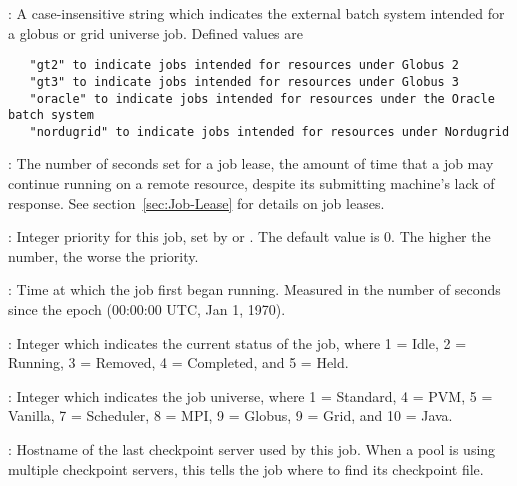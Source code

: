\begin{description}
\item[\AdAttr{JobGridType}] : A case-insensitive string which indicates
the external batch system intended for a globus or grid universe job.
Defined values are
\footnotesize
\begin{verbatim}
   "gt2" to indicate jobs intended for resources under Globus 2
   "gt3" to indicate jobs intended for resources under Globus 3
   "oracle" to indicate jobs intended for resources under the Oracle batch system
   "nordugrid" to indicate jobs intended for resources under Nordugrid
\end{verbatim}
\normalsize


\item[\AdAttr{JobLeaseDuration}] : The number of seconds set for
a job lease, the amount of time that a job may continue running
on a remote resource,
despite its submitting machine's lack of response.
See section~\ref{sec:Job-Lease} for details on job leases.

\item[\AdAttr{JobPrio}] : Integer priority for this job, set by
 or .  The default value is 0.  The higher
the number, the worse the priority.

\item[\AdAttr{JobStartDate}] : Time at which the job first began
running.  Measured in the
number of seconds since the epoch (00:00:00 UTC, Jan 1, 1970).

\item[\AdAttr{JobStatus}] : Integer which indicates the current
status of the job, where 1 = Idle, 2 = Running, 3 = Removed, 4 =
Completed, and 5 = Held.

\item[\AdAttr{JobUniverse}] : Integer which indicates the job
universe, where 1 = Standard, 4 = PVM, 5 = Vanilla, 7 = Scheduler,
8 = MPI, 9 = Globus, 9 = Grid, and 10 = Java.

\item[\AdAttr{LastCkptServer}] : Hostname of the last checkpoint
server used by this job.  When a pool is using multiple checkpoint
servers, this tells the job where to find its checkpoint file.


\end{description}
